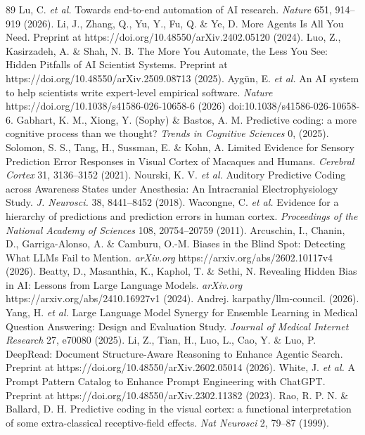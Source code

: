 \documentclass[12pt]{article}
\begin{document}
\begin{thebibliography}{89}
 Lu, C. \emph{et al.} Towards end-to-end automation of AI research. \emph{Nature} 651, 914--919 (2026).
 Li, J., Zhang, Q., Yu, Y., Fu, Q. \& Ye, D. More Agents Is All You Need. Preprint at https://doi.org/10.48550/arXiv.2402.05120 (2024).
 Luo, Z., Kasirzadeh, A. \& Shah, N. B. The More You Automate, the Less You See: Hidden Pitfalls of AI Scientist Systems. Preprint at https://doi.org/10.48550/arXiv.2509.08713 (2025).
 Aygün, E. \emph{et al.} An AI system to help scientists write expert-level empirical software. \emph{Nature} https://doi.org/10.1038/s41586-026-10658-6 (2026) doi:10.1038/s41586-026-10658-6.
 Gabhart, K. M., Xiong, Y. (Sophy) \& Bastos, A. M. Predictive coding: a more cognitive process than we thought? \emph{Trends in Cognitive Sciences} 0, (2025).
 Solomon, S. S., Tang, H., Sussman, E. \& Kohn, A. Limited Evidence for Sensory Prediction Error Responses in Visual Cortex of Macaques and Humans. \emph{Cerebral Cortex} 31, 3136--3152 (2021).
 Nourski, K. V. \emph{et al.} Auditory Predictive Coding across Awareness States under Anesthesia: An Intracranial Electrophysiology Study. \emph{J. Neurosci.} 38, 8441--8452 (2018).
 Wacongne, C. \emph{et al.} Evidence for a hierarchy of predictions and prediction errors in human cortex. \emph{Proceedings of the National Academy of Sciences} 108, 20754--20759 (2011).
 Arcuschin, I., Chanin, D., Garriga-Alonso, A. \& Camburu, O.-M. Biases in the Blind Spot: Detecting What LLMs Fail to Mention. \emph{arXiv.org} https://arxiv.org/abs/2602.10117v4 (2026).
 Beatty, D., Masanthia, K., Kaphol, T. \& Sethi, N. Revealing Hidden Bias in AI: Lessons from Large Language Models. \emph{arXiv.org} https://arxiv.org/abs/2410.16927v1 (2024).
 Andrej. karpathy/llm-council. (2026).
 Yang, H. \emph{et al.} Large Language Model Synergy for Ensemble Learning in Medical Question Answering: Design and Evaluation Study. \emph{Journal of Medical Internet Research} 27, e70080 (2025).
 Li, Z., Tian, H., Luo, L., Cao, Y. \& Luo, P. DeepRead: Document Structure-Aware Reasoning to Enhance Agentic Search. Preprint at https://doi.org/10.48550/arXiv.2602.05014 (2026).
 White, J. \emph{et al.} A Prompt Pattern Catalog to Enhance Prompt Engineering with ChatGPT. Preprint at https://doi.org/10.48550/arXiv.2302.11382 (2023).
 Rao, R. P. N. \& Ballard, D. H. Predictive coding in the visual cortex: a functional interpretation of some extra-classical receptive-field effects. \emph{Nat Neurosci} 2, 79--87 (1999).

\end{thebibliography}
\end{document}
